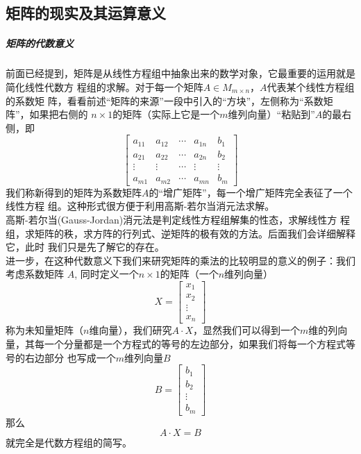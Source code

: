 \documentclass[a4paper,12pt]{ctexart}
\begin{document}
	\subsection{矩阵的现实及其运算意义}
		\subparagraph{矩阵的代数意义}
		前面已经提到，矩阵是从线性方程组中抽象出来的数学对象，它最重要的运用就是简化线性代数方
		程组的求解。对于每一个矩阵$A \in M_{m \times n}$，$A$代表某个线性方程组的系数矩
		阵，看看前述“矩阵的来源”一段中引入的“方块”，左侧称为“系数矩阵”，如果把右侧的
		$n\times 1$的矩阵（实际上它是一个$m$维列向量）“粘贴到”$A$的最右侧，即
		$$
		\left[
		\begin{array}{ccccc}
		a_{11} & a_{12} & \cdots & a_{1n} & b_1 \\
		a_{21} & a_{22} & \cdots & a_{2n} & b_2 \\
		\vdots & \vdots & \cdots & \vdots & \vdots\\
		a_{m1} & a_{m2} & \cdots & a_{mn} & b_m
		\end{array}
		\right]
		$$
		我们称新得到的矩阵为系数矩阵$A$的“增广矩阵”，每一个增广矩阵完全表征了一个线性方程
		组。这种形式很方便于利用高斯-若尔当消元法求解。\\
		\indent
		高斯-若尔当(Gauss-Jordan)消元法是判定线性方程组解集的性态，求解线性方
		程组，求矩阵的秩，求方阵的行列式、逆矩阵的极有效的方法。后面我们会详细解释它，此时
		我们只是先了解它的存在。\\
		\indent
		进一步，在这种代数意义下我们来研究矩阵的乘法的比较明显的意义的例子：我们考虑系数矩阵
		$A$,
		同时定义一个$n\times 1$的矩阵（一个$n$维列向量）
		$$		
		X=
		\left[
		\begin{array}{rl}
		x_1\\
		x_2\\
		\vdots \\
		x_n
		\end{array}
		\right]
		$$
		称为未知量矩阵（$n$维向量），我们研究$A\cdot X$，显然我们可以得到一个$m$维的列向
		量，其每一个分量都是一个方程式的等号的左边部分，如果我们将每一个方程式等号的右边部分
		也写成一个$m$维列向量$B$
		$$		
		B=
		\left[
		\begin{array}{rl}
		b_1\\
		b_2\\
		\vdots \\
		b_m
		\end{array}
		\right]
		$$
		那么
		$$
		A \cdot X = B
		$$
		就完全是代数方程组的简写。
		
\end{document}
